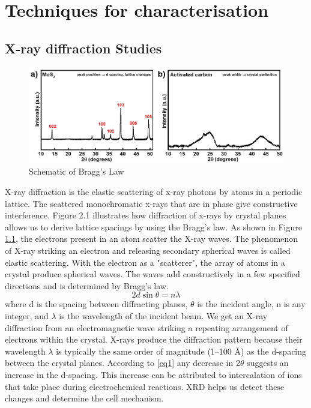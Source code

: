 
\chapter{Techniques for characterisation} %

\label{chap2} %
\section{X-ray diffraction Studies}
\begin{figure}[tbh!]
\centering
\includegraphics[width=\textwidth]{Figures/chap2fig/XRD}
\caption{Schematic of Bragg's Law}
\label{Figures/chap2fig:XRD}
\end{figure}
X-ray diffraction is the elastic scattering of x-ray photons by atoms in a periodic lattice. The scattered monochromatic x-rays that are in phase give constructive interference. Figure 2.1 illustrates how diffraction of x-rays by crystal planes allows us to derive lattice spacings by using the Bragg's law. As shown in Figure \ref{Figures/chap2fig:XRD}, the electrons present in an atom scatter the X-ray waves. The phenomenon of X-ray striking an electron and releasing secondary spherical waves is called elastic scattering. With the electron as a "scatterer", the array of atoms in a crystal produce spherical waves. The waves add constructively in a few specified directions  and is determined by Bragg's law.
 \begin{equation} \label{eq1}
     2d\sin\theta = n{\lambda}
 \end{equation}
where d is the spacing between diffracting planes, $\theta$ is the incident angle, n is any integer, and $\lambda$ is the wavelength of the incident beam. We get an X-ray diffraction from an electromagnetic wave striking a repeating arrangement of electrons within the crystal. X-rays produce the diffraction pattern because their wavelength $\lambda$ is typically the same order of magnitude (1–100 \AA ) as the d-spacing between the crystal planes. According to \ref{eq1} any decrease in 2$\theta$ suggests an increase in the d-spacing. This increase can be attributed to intercalation of ions that take place during electrochemical reactions. XRD helps us detect these changes and determine the cell mechanism.

